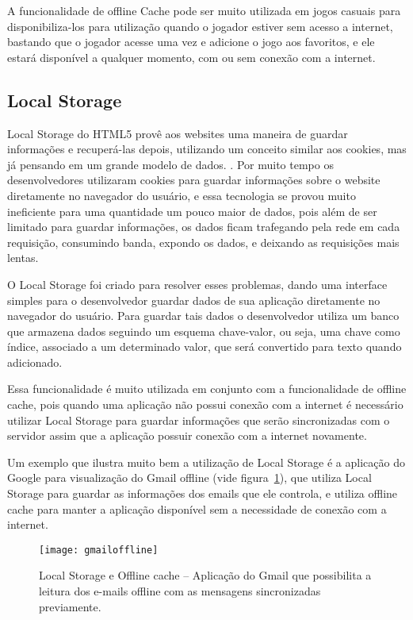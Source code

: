 A funcionalidade de offline Cache pode ser muito utilizada em jogos casuais para
disponibiliza-los para utilização quando o jogador estiver sem acesso
a internet, bastando que o jogador acesse uma vez e adicione o jogo aos favoritos,
e ele estará disponível a qualquer momento, com ou sem conexão com a
internet.


\subsection{Local Storage}

Local Storage do HTML5 provê aos websites uma maneira de guardar
informações e recuperá-las depois, utilizando um conceito similar aos
cookies, mas já pensando em um grande modelo de dados. \cite{pilgrim2010html5}.
Por muito tempo os desenvolvedores utilizaram cookies para guardar
informações sobre o website diretamente no navegador do usuário, e
essa tecnologia se provou muito ineficiente para uma quantidade um
pouco maior de dados, pois além de ser limitado para guardar informações,
os dados ficam trafegando pela rede em cada requisição, consumindo
banda, expondo os dados, e deixando as requisições mais lentas.

O Local Storage foi criado para resolver esses problemas, dando uma
interface simples para o desenvolvedor guardar dados de sua
aplicação diretamente no navegador do usuário. Para guardar tais dados
o desenvolvedor utiliza um banco que armazena dados seguindo um
esquema chave-valor, ou seja, uma chave como índice, associado a um
determinado valor, que será convertido para texto quando adicionado.

Essa funcionalidade é muito utilizada em conjunto com a funcionalidade
de offline cache, pois quando uma aplicação não possui conexão com a
internet é necessário utilizar Local Storage para guardar informações
que serão sincronizadas com o servidor assim que a aplicação possuir
conexão com a internet novamente.

Um exemplo que ilustra muito bem a utilização de Local Storage é a
aplicação do Google para visualização do Gmail offline (vide
figura~\ref{img:gmailoffline}), que utiliza Local Storage para guardar
as informações dos emails que ele controla, e utiliza offline cache
para manter a aplicação disponível sem a necessidade de conexão com a
internet.

\begin{figure}[H]
  \centering
	\texttt{[image: gmailoffline]}
  \caption{Local Storage e Offline cache {--} Aplicação do Gmail que possibilita a
  leitura dos e-mails offline com as mensagens sincronizadas
  previamente.}
  \label{img:gmailoffline}
\end{figure}

